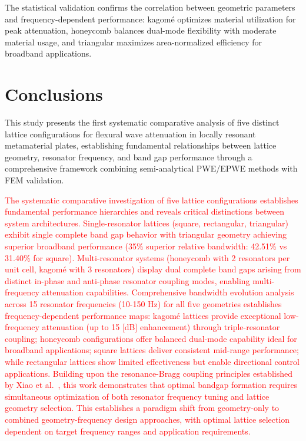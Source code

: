\documentclass[review,numbers,sort&compress]{elsarticle}
\begin{document}
{The statistical validation confirms the correlation between geometric parameters and frequency-dependent performance: kagomé optimizes material utilization for peak attenuation, honeycomb balances dual-mode flexibility with moderate material usage, and triangular maximizes area-normalized efficiency for broadband applications.

\section{Conclusions}\label{Conc}

This study presents the first systematic comparative analysis of five distinct lattice configurations for flexural wave attenuation in locally resonant metamaterial plates, establishing fundamental relationships between lattice geometry, resonator frequency, and band gap performance through a comprehensive framework combining semi-analytical PWE/EPWE methods with FEM validation.

\textcolor{red}{The systematic comparative investigation of five lattice configurations establishes fundamental performance hierarchies and reveals critical distinctions between system architectures. Single-resonator lattices (square, rectangular, triangular) exhibit single complete band gap behavior with triangular geometry achieving superior broadband performance (35\% superior relative bandwidth: 42.51\% vs 31.40\% for square). Multi-resonator systems (honeycomb with 2 resonators per unit cell, kagomé with 3 resonators) display dual complete band gaps arising from distinct in-phase and anti-phase resonator coupling modes, enabling multi-frequency attenuation capabilities. Comprehensive bandwidth evolution analysis across 15 resonator frequencies (10-150 Hz) for all five geometries establishes frequency-dependent performance maps: kagomé lattices provide exceptional low-frequency attenuation (up to 15 [dB] enhancement) through triple-resonator coupling; honeycomb configurations offer balanced dual-mode capability ideal for broadband applications; square lattices deliver consistent mid-range performance; while rectangular lattices show limited effectiveness but enable directional control applications. Building upon the resonance-Bragg coupling principles established by Xiao et al.~\cite{Xiao_2012}, this work demonstrates that optimal bandgap formation requires simultaneous optimization of both resonator frequency tuning and lattice geometry selection. This establishes a paradigm shift from geometry-only to combined geometry-frequency design approaches, with optimal lattice selection dependent on target frequency ranges and application requirements.}

}
\end{document}
